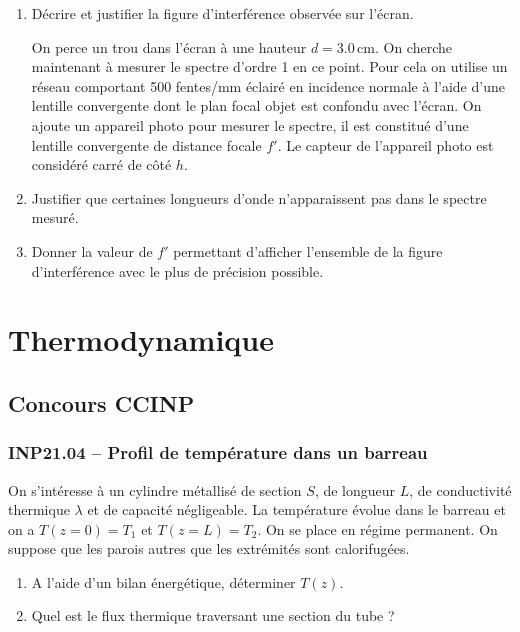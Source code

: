 \begin{enumerate}
\item Décrire et justifier la figure d'interférence observée sur l'écran.

On perce un trou dans l'écran à une hauteur $d = 3.0\,\text{cm}$. On cherche maintenant à mesurer le spectre d'ordre 1 en ce point. Pour cela on utilise un réseau comportant 500 fentes/mm éclairé en incidence normale à l'aide d'une lentille convergente dont le plan focal objet est confondu avec l'écran. On ajoute un appareil photo pour mesurer le spectre, il est constitué d'une lentille convergente de distance focale $f'$. Le capteur de l'appareil photo est considéré carré de côté $h$.

\item Justifier que certaines longueurs d'onde n'apparaissent pas dans le spectre mesuré.
\item Donner la valeur de $f'$ permettant d'afficher l'ensemble de la figure d'interférence avec le plus de précision possible.
\end{enumerate}

\newpage
\section*{Thermodynamique}
\subsection*{Concours CCINP}
\subsubsection*{INP21.04 -- Profil de température dans un barreau }

\begin{center}
\end{center}

On s'intéresse à un cylindre métallisé de section $S$, de longueur $L$, de conductivité thermique $\lambda$ et de capacité négligeable. La température évolue dans le barreau et on a $T(z = 0) = T_{1}$ et $T(z = L) = T_{2}$. On se place en régime permanent. On suppose que les parois autres que les extrémités sont calorifugées.

\begin{enumerate}
\item A l'aide d'un bilan énergétique, déterminer $T(z)$.
\item Quel est le flux thermique traversant une section du tube ?
\end{enumerate}

